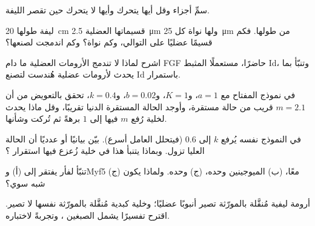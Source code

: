 \begin{exercise}[$\star$]\label{exo:b2:cell-differentiation:4}
سمِّ أجزاء  وقل أيها يتحرك وأيها لا يتحرك
حين تقصر الليفة.
\end{exercise}

\begin{exercise}[$\star\star$]\label{exo:b2:cell-differentiation:5}
ليفة طولها \qty{20}{cm} قسيماتها العضلية \qty{2.5}{\micro m} ولها
نواة كل \qty{25}{\micro m} من طولها. فكم قسيمًا عضليًا
على التوالي، وكم نواة؟ وكم  اندمجت
لصنعها؟
\end{exercise}

\begin{exercise}[$\star\star$]\label{exo:b2:cell-differentiation:6}
اشرح لماذا لا تندمج الأرومات العضلية ما دام FGF حاضرًا، مستعملًا
المثبط Id، وتنبّأ بما يحدث لأرومات عضلية هُندست
لتصنع Id باستمرار.
\end{exercise}

\begin{exercise}[$\star\star$]\label{exo:b2:cell-differentiation:7}
في نموذج المفتاح مع $a = 1$، و$K = 1$، و$b = 0.02$، و$k = 0.4$،
تحقق بالتعويض من أن $m = 2.1$ قريب من حالة مستقرة،
وأوجد الحالة المستقرة الدنيا تقريبًا، وقل ماذا يحدث
لخلية رُفع $m$ فيها إلى $1$ برهةً ثم تُركت وشأنها.
\end{exercise}

\begin{exercise}[$\star\star$]\label{exo:b2:cell-differentiation:8}
في النموذج نفسه يُرفع $k$ إلى $0.6$ (فيتحلل العامل
أسرع). بيّن بيانيًا أو عدديًا أن الحالة العليا
تزول. وبماذا يتنبأ هذا في خلية زُعزع فيها استقرار ؟
\end{exercise}

\begin{exercise}[$\star\star$]\label{exo:b2:cell-differentiation:9}
تنبّأ  لفأر يفتقر إلى (أ)  وMyf5 معًا،
(ب) الميوجينين وحده، (ج)  وحده. ولماذا يكون (ج) شبه سوي؟
\end{exercise}

\begin{exercise}[$\star\star\star$]\label{exo:b2:cell-differentiation:10}
أرومة ليفية مُنقَّلة بالمورّثة  تصير أنبوبًا عضليًا؛ وخلية كبدية
مُنقَّلة بالمورّثة نفسها لا تصير. اقترح تفسيرًا يشمل الصبغين
، وتجربةً لاختباره.
\end{exercise}

